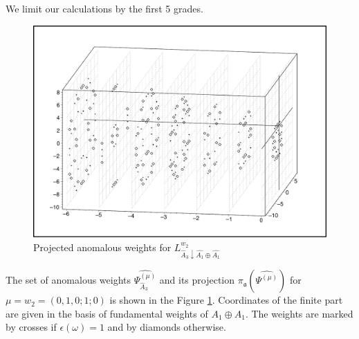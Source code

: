 \documentclass[a4paper,12pt]{article}
\theoremstyle{definition} \newtheorem{Def}{Definition}
\begin{document}
We limit our calculations by the first 5 grades.
\begin{figure}[h!tb]
  \includegraphics[width=135mm]{A1+A1-A3_anom.pdf}
  \caption{Projected anomalous weights for $L^{w_2}_{\hat A_3\downarrow \hat{A_1}\oplus\hat{A_1}}$}
  \label{fig:A1+A1-A3_anom}
\end{figure}

The set of anomalous weights $\widehat{\Psi_{\hat A_3}^{(\mu)}}$
and its projection $\pi_{\mathfrak{a}}\left(\widehat{\Psi^{(\mu)}}\right)$ for
$\mu=w_2=(0,1,0;1;0)$ is shown in the Figure \ref{fig:A1+A1-A3_anom}.
Coordinates of the finite part are given in the basis of fundamental weights of $A_1\oplus A_1$.
The weights are marked by crosses if $\epsilon(\omega)=1$ and by diamonds otherwise.
\end{document}

